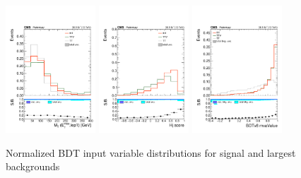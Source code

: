 \begin{figure}[htp]
\centering
\includegraphics[width=0.3\textwidth]{ch9_figs/kinMVA_input_MT_met_lep1.pdf}
\includegraphics[width=0.3\textwidth]{ch9_figs/kinMVA_input_BDTv8_eventReco_Hj_score.pdf}
\includegraphics[width=0.3\textwidth]{ch9_figs/kinMVA_input_BDTv8_eventReco_mvaValue.pdf}
\caption[Signal extraction BDT input variables]{Normalized BDT input variable distributions for signal and largest backgrounds}
\label{fig:inputs2.5}
\end{figure}

